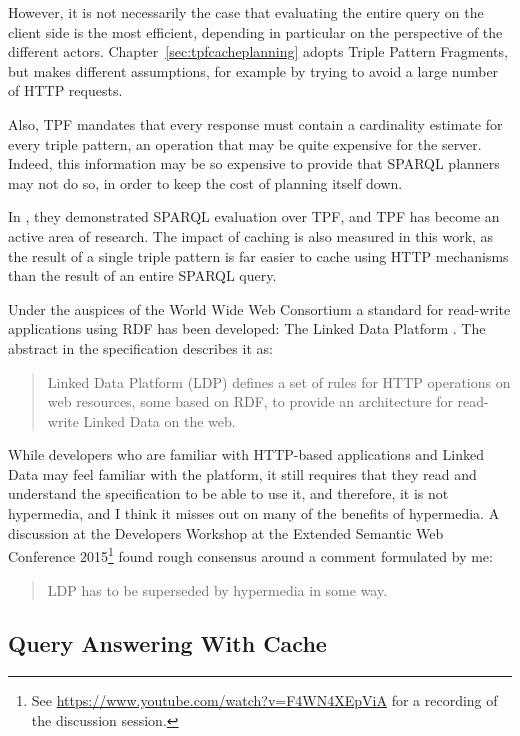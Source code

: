 However, it is not necessarily the case that evaluating the entire
query on the client side is the most efficient, depending in
particular on the perspective of the different
actors. Chapter~\ref{sec:tpfcacheplanning} adopts Triple Pattern
Fragments, but makes different assumptions, for example by trying to avoid a
large number of HTTP requests. 

Also, TPF mandates that every response must contain a cardinality
estimate for every triple pattern, an operation that may be quite
expensive for the server.
Indeed, this information may be so expensive to provide that SPARQL
planners may not do so, in order to keep the cost of planning itself
down.

In \cite{verborgh2014querying}, they demonstrated SPARQL evaluation
over TPF, and TPF has become an active area of research. The impact of
caching is also measured in this work, as the result of a single
triple pattern is far easier to cache using HTTP mechanisms than the
result of an entire SPARQL query.

Under the auspices of the  World Wide Web Consortium a standard for
read-write applications using RDF has been developed: The Linked Data
Platform \cite{ldp1}. The abstract in the specification describes it
as:
\begin{quote}
Linked Data Platform (LDP) defines a set of rules for HTTP operations
on web resources, some based on RDF, to provide an architecture for
read-write Linked Data on the web.
\end{quote}
While developers who are familiar with HTTP-based applications and
Linked Data may feel familiar with the platform, it still requires
that they read and understand the specification to be able to use it,
and therefore, it is not hypermedia, and I think it misses out on many
of the benefits of hypermedia. A discussion at the Developers Workshop
at the Extended Semantic Web Conference 2015\footnote{See
  \url{https://www.youtube.com/watch?v=F4WN4XEpViA} for a recording of
  the discussion session.} found rough consensus around a comment
formulated by me:
\begin{quote}
LDP has to be superseded by hypermedia in some way.
\end{quote}


\subsection{Query Answering With Cache}\label{sec:relcache}

